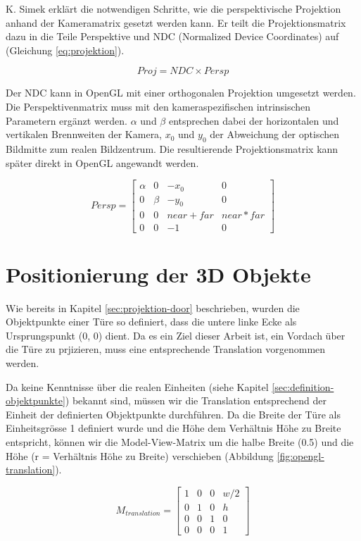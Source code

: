 K. Simek \cite{simek} erklärt die notwendigen Schritte, wie die perspektivische Projektion anhand der Kameramatrix gesetzt werden kann. Er teilt die Projektionsmatrix dazu in die Teile Perspektive und NDC (Normalized Device Coordinates) auf (Gleichung \ref{eq:projektion}).

\begin{equation}
Proj = NDC \times Persp
\label{eq:projektion}
\end{equation}

Der NDC kann in OpenGL mit einer orthogonalen Projektion umgesetzt werden. Die Perspektivenmatrix muss mit den kameraspezifischen intrinsischen Parametern ergänzt werden. $\alpha$ und $\beta$ entsprechen dabei der horizontalen und vertikalen Brennweiten der Kamera, $x_0$ und $y_0$ der Abweichung der optischen Bildmitte zum realen Bildzentrum. Die resultierende Projektionsmatrix kann später direkt in OpenGL angewandt werden.

\begin{equation}
Persp
=
\begin{bmatrix}
\alpha & 0 & -x_0 & 0 \\
0 & \beta & -y_0 & 0 \\
0 & 0 & near + far & near * far \\
0 & 0 & -1 & 0
\end{bmatrix} 
\end{equation}


\section{Positionierung der 3D Objekte}

Wie bereits in Kapitel \ref{sec:projektion-door} beschrieben, wurden die Objektpunkte einer Türe so definiert, dass die untere linke Ecke als Ursprungspunkt (0, 0) dient. Da es ein Ziel dieser Arbeit ist, ein Vordach über die Türe zu prjizieren, muss eine entsprechende Translation vorgenommen werden.

Da keine Kenntnisse über die realen Einheiten (siehe Kapitel \ref{sec:definition-objektpunkte}) bekannt sind, müssen wir die Translation entsprechend der Einheit der definierten Objektpunkte durchführen. Da die Breite der Türe als Einheitsgrösse 1 definiert wurde und die Höhe dem Verhältnis Höhe zu Breite entspricht, können wir die Model-View-Matrix um die halbe Breite (0.5) und die Höhe (r = Verhältnis Höhe zu Breite) verschieben (Abbildung \ref{fig:opengl-translation}).

\begin{equation}
M_{translation}
=
\begin{bmatrix}
1 & 0 & 0 & w/2 \\
0 & 1 & 0 & h \\
0 & 0 & 1 & 0 \\
0 & 0 & 0 & 1
\end{bmatrix} 
\end{equation}



